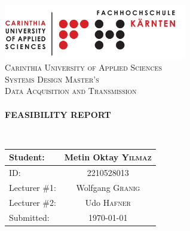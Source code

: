 \begin{titlepage}
    \begin{center}
        \includegraphics[width=0.60\textwidth]{../pics/FH}\\[1.5cm]

        \textsc{\LARGE Carinthia University of Applied Sciences}\\[1.5cm]

        \textsc{\Large Systems Design Master's}\\[1.5cm]
        \textsc{\Large Data Acquisition and Transmission}\\[2.5cm]

        \HRule \\[1cm]

        { \LARGE \bfseries \textsc{FEASIBILITY REPORT}}

        \HRule \\[1cm]

        \vspace{2.5cm}

        	\begin{table}[H]
        		\centering
        		\begin{tabular}{|l|c|}
        			\toprule
        			Student: & Metin Oktay \textsc{Yilmaz} \\
        			\midrule
        			ID: & 2210528013   	\\
        			Lecturer \#1: & Wolfgang  \textsc{Granig}  \\
                    Lecturer \#2: & Udo  \textsc{Hafner}  \\
        			Submitted: & {\large \today}  	\\
        			\bottomrule
        		\end{tabular}
        	\end{table}
    \end{center}
\end{titlepage}